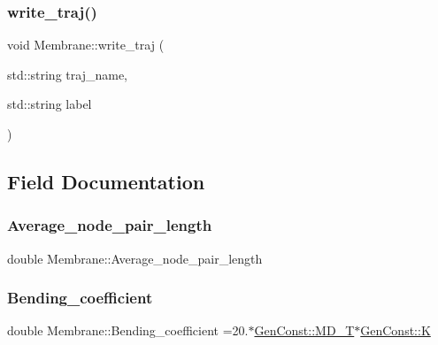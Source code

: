 \subsubsection{\texorpdfstring{write\_traj()}{write\_traj()}\hspace{0.1cm}{\footnotesize\ttfamily [2/2]}}
{\footnotesize\ttfamily void Membrane\+::write\+\_\+traj (\begin{DoxyParamCaption}\item[{std\+::string}]{traj\+\_\+name,  }\item[{std\+::string}]{label }\end{DoxyParamCaption})}



\subsection{Field Documentation}
\mbox{\label{classMembrane_ae80a22b9f52cc51918d78269af4a2061}} 
\subsubsection{\texorpdfstring{Average\_node\_pair\_length}{Average\_node\_pair\_length}}
{\footnotesize\ttfamily double Membrane\+::\+Average\+\_\+node\+\_\+pair\+\_\+length}

\mbox{\label{classMembrane_a25001dd440e0d8631a7191b3750f4188}} 
\subsubsection{\texorpdfstring{Bending\_coefficient}{Bending\_coefficient}}
{\footnotesize\ttfamily double Membrane\+::\+Bending\+\_\+coefficient =20.$\ast$\mbox{\hyperlink{namespaceGenConst_ae4fd28941bbc23f551687bc507c5bde7}{Gen\+Const\+::\+M\+D\+\_\+T}}$\ast$\mbox{\hyperlink{namespaceGenConst_a80679742796064a242391cd8e3c067d0}{Gen\+Const\+::K}}}

\mbox{\label{classMembrane_a9908419011350ca5fea46af3f881425c}} 
